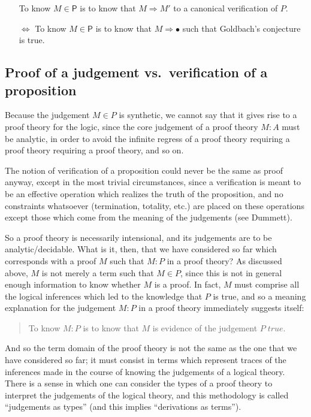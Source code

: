 \documentclass{amsart}
\theoremstyle{definition}
\theoremstyle{remark}
\numberwithin{equation}{section}
\newcommand\istrue[1]{\ensuremath{#1\;\mathit{true}}}
\newcommand\ver[2]{\ensuremath{#1\in#2}}
\newcommand\reduce[2]{\ensuremath{#1\Rightarrow#2}}
\begin{document}
\begin{itemize}
  \item[] To know \ver{M}{\mathsf{P}} is to know that \reduce{M}{M'} to a
    canonical verification of $P$.
  \item[$\Leftrightarrow$] To know $\ver{M}{\mathsf{P}}$ is to know that
    \reduce{M}{\bullet} such that Goldbach's conjecture is true.
\end{itemize}

\subsection{Proof of a judgement vs.\ verification of a proposition}

Because the judgement \ver{M}{P} is synthetic, we cannot say that it gives rise
to a proof theory for the logic, since the core judgement of a proof theory
$M:A$ must be analytic, in order to avoid the infinite regress of a proof
theory requiring a proof theory requiring a proof theory, and so on.

The notion of verification of a proposition could never be the same as proof
anyway, except in the most trivial circumstances, since a verification is meant
to be an effective operation which realizes the truth of the proposition, and
no constraints whatsoever (termination, totality, etc.) are placed on these
operations except those which come from the meaning of the judgements (see
Dummett).

So a proof theory is necessarily intensional, and its judgements are to be
analytic/decidable. What is it, then, that we have considered so far which
corresponds with a proof $M$ such that $M:P$ in a proof theory? As discussed
above, $M$ is not merely a term such that \ver{M}{P}, since this is not in
general enough information to know whether $M$ is a proof. In fact, $M$ must
comprise all the logical inferences which led to the knowledge that $P$ is
true, and so a meaning explanation for the judgement $M:P$ in a proof theory
immediately suggests itself:
\begin{quote}
  To know $M:P$ is to know that $M$ is evidence of the judgement \istrue{P}.
\end{quote}

And so the term domain of the proof theory is not the same as the one that we
have considered so far; it must consist in terms which represent traces of the
inferences made in the course of knowing the judgements of a logical theory.
There is a sense in which one can consider the types of a proof theory to
interpret the judgements of the logical theory, and this methodology is called
``judgements as types'' (and this implies ``derivations as terms'').
\end{document}
